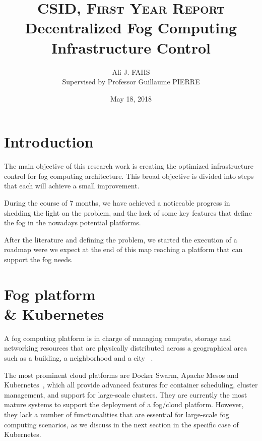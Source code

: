 \documentclass[10pt,twocolumn,letterpaper]{article}
\title{
        \usefont{OT1}{bch}{b}{n}
        \normalfont \normalsize \textsc{CSID, First Year Report} \\ [10pt]
        \huge  Decentralized Fog Computing Infrastructure Control \\
}
\author{Ali J. FAHS \\
Supervised by Professor Guillaume PIERRE}
\date{May 18, 2018}
\affil{\small{Univ Rennes, Inria, CNRS, IRISA}}
\begin{document}
\maketitle


\section{Introduction}
The main objective of this research work is creating the optimized infrastructure control for fog computing architecture. This broad objective is divided into steps that each will achieve a small improvement. 

During the course of 7 months, we have achieved a noticeable progress in shedding the light on the problem, and the lack of some key features that define the fog in the nowadays potential platforms. 

After the literature and defining the problem, we started the execution of a roadmap were we expect at the end of this map reaching a platform that can support the fog needs. 

\section{Fog platform \\ \& Kubernetes }

A fog computing platform is in charge of managing compute, storage and networking resources that are physically distributed across a geographical area such as a building, a neighborhood and a city ~\cite{bonomi2014, fogecosystem}.

The most prominent cloud platforms are Docker Swarm, Apache Mesos and Kubernetes~\cite{burns2016borg}, which all provide advanced features for container scheduling, cluster management, and support for large-scale clusters. They are currently the most mature systems to support the deployment of a fog/cloud platform. However, they lack a number of functionalities that are essential for large-scale fog computing scenarios, as we discuss in
the next section in the specific case of Kubernetes.
\end{document}
